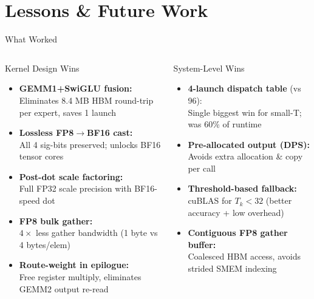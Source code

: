 
\section{Lessons \& Future Work}

\begin{frame}{What Worked}
\begin{columns}[T]
\begin{exampleblock}{Kernel Design Wins}
\small
\begin{itemize}
  \item \textbf{GEMM1+SwiGLU fusion:}\\
    Eliminates 8.4 MB HBM round-trip per expert, saves 1 launch
  \item \textbf{Lossless FP8$\to$BF16 cast:}\\
    All 4 sig-bits preserved; unlocks BF16 tensor cores
  \item \textbf{Post-dot scale factoring:}\\
    Full FP32 scale precision with BF16-speed dot
  \item \textbf{FP8 bulk gather:}\\
    $4\times$ less gather bandwidth (1 byte vs 4 bytes/elem)
  \item \textbf{Route-weight in epilogue:}\\
    Free register multiply, eliminates GEMM2 output re-read
\end{itemize}
\end{exampleblock}

\begin{block}{System-Level Wins}
\small
\begin{itemize}
  \item \textbf{4-launch dispatch table} (vs 96):\\
    Single biggest win for small-T; was 60\% of runtime
  \item \textbf{Pre-allocated output (DPS):}\\
    Avoids extra allocation \& copy per call
  \item \textbf{Threshold-based fallback:}\\
    cuBLAS for $T_k < 32$ (better accuracy + low overhead)
  \item \textbf{Contiguous FP8 gather buffer:}\\
    Coalesced HBM access, avoids strided SMEM indexing
\end{itemize}
\end{block}
\end{columns}
\end{frame}


